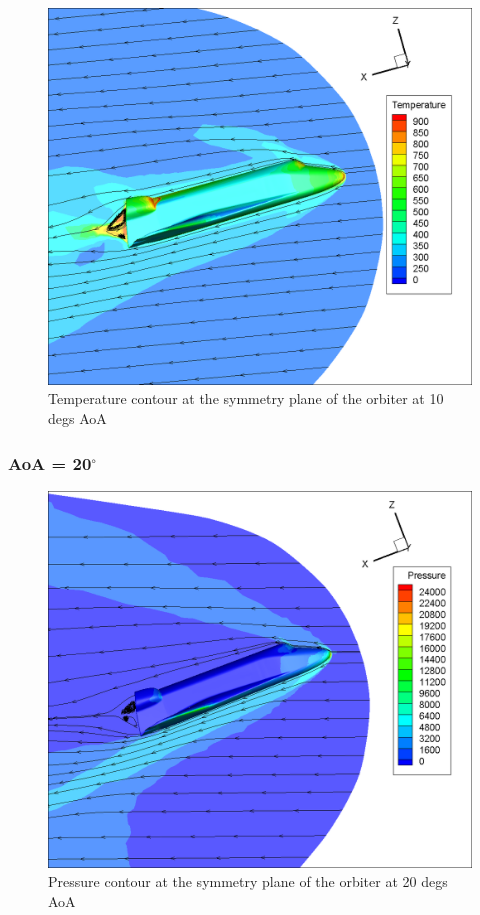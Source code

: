 \begin{figure}[H]
 \centering
 \includegraphics[width=\textwidth]{report_images/10_sym_temp_contour.png}
 \caption{Temperature contour at the symmetry plane of the orbiter at 10 degs AoA}
 \label{fig: 10_sym_temp_contour}
\end{figure}

\subsubsection{AoA = 20$^\circ$}
\begin{figure}[H]
 \centering
 \includegraphics[width=\textwidth]{report_images/20_sym_pressure_contour.png}
 \caption{Pressure contour at the symmetry plane of the orbiter at 20 degs AoA}
 \label{fig: 20_sym_pressure_contour}
\end{figure}

